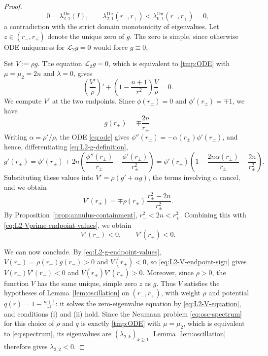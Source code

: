 \documentclass[11pt]{article}
\numberwithin{equation}{section}
\theoremstyle{definition}
\begin{document}
\begin{proof}
 \begin{equation}
    0=\lambda^{\operatorname{Dir}}_{2,1}(I), \qquad \lambda^{\operatorname{Dir}}_{2,1}(r_-,r_+)<\lambda^{\operatorname{Dir}}_{0,1}(r_-,r_+)=0,
 \end{equation}
 a contradiction with the strict domain monotonicity of eigenvalues. Let $z\in(r_-,r_+)$ denote the unique zero of $g$.
The zero is simple, since otherwise ODE uniqueness for $\mathscr L_2g=0$ would force $g\equiv0$.

Set $V:=\rho g$. The equation $\mathscr L_2g=0$, which is equivalent to \eqref{tmp:ODE}
with $\mu=\mu_2=2n$ and $\lambda=0$, gives
\begin{equation}\label{eq:L2-V-equation}
    \left(\frac{V'}{\rho}\right)'
    +\left(1-\frac{n+1}{r^2}\right)\frac{V}{\rho}=0.
\end{equation}
We compute $V'$ at the two endpoints. Since
$\phi(r_\pm)=0$ and $\phi'(r_\pm)=\mp1$, we have
\begin{equation}\label{eq:L2-g-endpoint-values}
    g(r_\pm)=\mp\frac{2n}{r_\pm}.
\end{equation}
Writing $\alpha=\rho'/\rho$, the ODE \eqref{eq:ode} gives $\phi''(r_\pm)=-\alpha(r_\pm)\phi'(r_\pm)$, and hence, differentiating \eqref{eq:L2-g-definition},
\[
    g'(r_\pm)
    =
    \phi'(r_\pm)
    +
    2n\left(\frac{\phi''(r_\pm)}{r_\pm}
    -\frac{\phi'(r_\pm)}{r_\pm^2}\right)
    =
    \phi'(r_\pm)\left(1-\frac{2n\alpha(r_\pm)}{r_\pm}
    -\frac{2n}{r_\pm^2}\right).
\]
Substituting these values into $V'=\rho(g'+\alpha g)$, the terms involving $\alpha$ cancel, and we obtain
\begin{equation}\label{eq:L2-Vprime-endpoint-values}
    V'(r_\pm)
    =
    \mp\rho(r_\pm)\,\frac{r_\pm^2-2n}{r_\pm^2}.
\end{equation}
By Proposition~\ref{prop:annulus-containment}, $r_-^2<2n<r_+^2$.
Combining this with \eqref{eq:L2-Vprime-endpoint-values}, we obtain
\begin{equation}\label{eq:L2-V-endpoint-sign}
    V'(r_-)<0,\qquad V'(r_+)<0.
\end{equation}

We can now conclude. By \eqref{eq:L2-g-endpoint-values}, $V(r_-)=\rho(r_-)g(r_-)>0$ and $V(r_+)<0$, so \eqref{eq:L2-V-endpoint-sign} gives $V(r_-)V'(r_-)<0$ and $V(r_+)V'(r_+)>0$.
Moreover, since $\rho>0$, the function $V$ has the same unique, simple zero $z$ as $g$. Thus $V$ satisfies the hypotheses of Lemma~\ref{lem:oscillation} on $(r_-,r_+)$, with weight $\rho$ and potential $q(r)=1-\frac{n+1}{r^2}$: it solves the zero-eigenvalue equation by \eqref{eq:L2-V-equation}, and conditions (i) and (ii) hold. Since the Neumann problem \eqref{eq:osc-spectrum} for this choice of $\rho$ and $q$ is exactly \eqref{tmp:ODE} with $\mu=\mu_2$, which is equivalent to \eqref{eq:spectrum}, its eigenvalues are $(\lambda_{2,k})_{k\geq 1}$. Lemma~\ref{lem:oscillation} therefore gives $\lambda_{2,2}<0$.
\end{proof}
\end{document}

